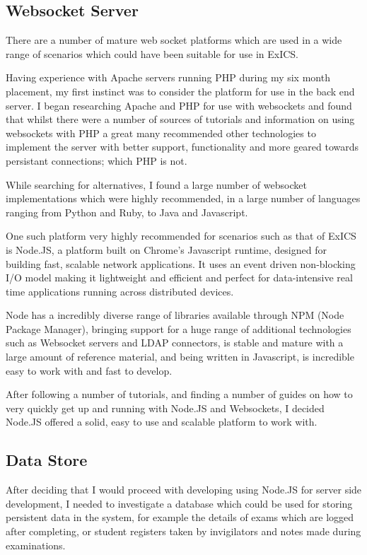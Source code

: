 \subsection{Websocket Server}

There are a number of mature web socket platforms which are used in a wide range of scenarios which could have been suitable for use in ExICS.

Having experience with Apache servers running PHP during my six month placement, my first instinct was to consider the platform for use in the back end server.  I began researching Apache and PHP for use with websockets and found that whilst there were a number of sources of tutorials and information on using websockets with PHP a great many recommended other technologies to implement the server with better support, functionality and more geared towards persistant connections; which PHP is not.

While searching for alternatives, I found a large number of websocket implementations which were highly recommended, in a large number of languages ranging from Python and Ruby, to Java and Javascript.

One such platform very highly recommended for scenarios such as that of ExICS \cite{whyNodeJS} is Node.JS, a platform built on Chrome's Javascript runtime, designed for building fast, scalable network applications.  It uses an event driven non-blocking I/O model making it lightweight and efficient and perfect for data-intensive real time applications running across distributed devices.\cite{nodeJS}

Node has a incredibly diverse range of libraries available through NPM (Node Package Manager), bringing support for a huge range of additional technologies such as Websocket servers and LDAP connectors, is stable and mature with a large amount of reference material, and being written in Javascript, is incredible easy to work with and fast to develop.

After following a number of tutorials, and finding a number of guides on how to very quickly get up and running with Node.JS and Websockets, I decided Node.JS offered a solid, easy to use and scalable platform to work with.

\subsection{Data Store}

After deciding that I would proceed with developing using Node.JS for server side development, I needed to investigate a database which could be used for storing persistent data in the system, for example the details of exams which are logged after completing, or student registers taken by invigilators and notes made during examinations.

